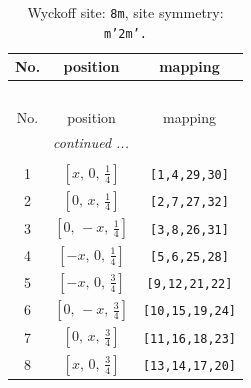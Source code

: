 \documentclass[fleqn,8pt]{jsarticle}
\begin{document}
\begin{longtable}{ccc}
\caption{Wyckoff site: {\tt 8m}, site symmetry: {\tt m'2m'.}}
 \\
 \hline \hline
No. & position & mapping \\ \hline \endfirsthead

\multicolumn{2}{l}{\tablename\ \thetable{}} \\
 \hline \hline
No. & position & mapping \\ \hline \endhead

 \hline \hline
\multicolumn{2}{r}{\footnotesize\it continued ...} \\ \endfoot

 \hline \hline
\multicolumn{2}{r}{} \\ \endlastfoot

1 & $\left[ x,\, 0,\, \frac{1}{4} \right]$ & {\tt [1,4,29,30]} \\ \hline
2 & $\left[ 0,\, x,\, \frac{1}{4} \right]$ & {\tt [2,7,27,32]} \\ \hline
3 & $\left[ 0,\, - x,\, \frac{1}{4} \right]$ & {\tt [3,8,26,31]} \\ \hline
4 & $\left[ - x,\, 0,\, \frac{1}{4} \right]$ & {\tt [5,6,25,28]} \\ \hline
5 & $\left[ - x,\, 0,\, \frac{3}{4} \right]$ & {\tt [9,12,21,22]} \\ \hline
6 & $\left[ 0,\, - x,\, \frac{3}{4} \right]$ & {\tt [10,15,19,24]} \\ \hline
7 & $\left[ 0,\, x,\, \frac{3}{4} \right]$ & {\tt [11,16,18,23]} \\ \hline
8 & $\left[ x,\, 0,\, \frac{3}{4} \right]$ & {\tt [13,14,17,20]} \\
\end{longtable}
\renewcommand{\arraystretch}{1.2}
\end{document}
